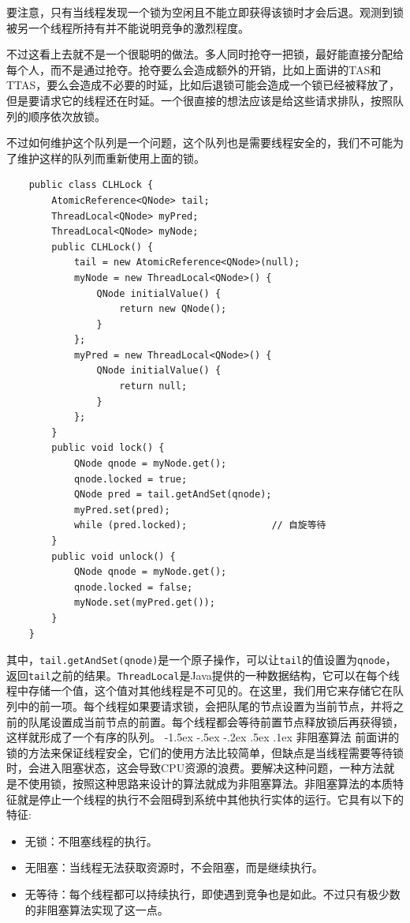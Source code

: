 \documentclass[a4paper, 11pt]{ctexart}
\makeatletter
\newcommand{\sihao}{\fontsize{14pt}{\baselineskip}\selectfont}
\renewcommand\section{\@startsection{section}{1}{\z@}%
{-1.5ex \@plus -.5ex \@minus -.2ex}%
{.5ex \@plus .1ex}%
{\normalfont\sihao\CJKfamily{hei}}}
\makeatother
\begin{document}
要注意，只有当线程发现一个锁为空闲且不能立即获得该锁时才会后退。观测到锁被另一个线程所持有并不能说明竞争的激烈程度。

不过这看上去就不是一个很聪明的做法。多人同时抢夺一把锁，最好能直接分配给每个人，而不是通过抢夺。抢夺要么会造成额外的开销，比如上面讲的TAS和TTAS，要么会造成不必要的时延，比如后退锁可能会造成一个锁已经被释放了，但是要请求它的线程还在时延。一个很直接的想法应该是给这些请求排队，按照队列的顺序依次放锁。

不过如何维护这个队列是一个问题，这个队列也是需要线程安全的，我们不可能为了维护这样的队列而重新使用上面的锁。
\begin{lstlisting}
    public class CLHLock {
        AtomicReference<QNode> tail;
        ThreadLocal<QNode> myPred;
        ThreadLocal<QNode> myNode;
        public CLHLock() {
            tail = new AtomicReference<QNode>(null);
            myNode = new ThreadLocal<QNode>() {
                QNode initialValue() {
                    return new QNode();
                }
            };
            myPred = new ThreadLocal<QNode>() {
                QNode initialValue() {
                    return null;
                }
            };
        }
        public void lock() {
            QNode qnode = myNode.get();
            qnode.locked = true;
            QNode pred = tail.getAndSet(qnode);
            myPred.set(pred);
            while (pred.locked);               // 自旋等待
        }
        public void unlock() {
            QNode qnode = myNode.get();
            qnode.locked = false;
            myNode.set(myPred.get());
        }
    }
\end{lstlisting}

其中，\lstinline|tail.getAndSet(qnode)|是一个原子操作，可以让\lstinline|tail|的值设置为\lstinline|qnode|，返回\lstinline|tail|之前的结果。\lstinline|ThreadLocal|是Java提供的一种数据结构，它可以在每个线程中存储一个值，这个值对其他线程是不可见的。在这里，我们用它来存储它在队列中的前一项。每个线程如果要请求锁，会把队尾的节点设置为当前节点，并将之前的队尾设置成当前节点的前置。每个线程都会等待前置节点释放锁后再获得锁，这样就形成了一个有序的队列。
\section{非阻塞算法}  
前面讲的锁的方法来保证线程安全，它们的使用方法比较简单，但缺点是当线程需要等待锁时，会进入阻塞状态，这会导致CPU资源的浪费。要解决这种问题，一种方法就是不使用锁，按照这种思路来设计的算法就成为非阻塞算法。非阻塞算法的本质特征就是停止一个线程的执行不会阻碍到系统中其他执行实体的运行。它具有以下的特征:
\begin{itemize}
\item 无锁：不阻塞线程的执行。
\item 无阻塞：当线程无法获取资源时，不会阻塞，而是继续执行。
\item 无等待：每个线程都可以持续执行，即使遇到竞争也是如此。不过只有极少数的非阻塞算法实现了这一点。
\end{itemize}
\end{document}
